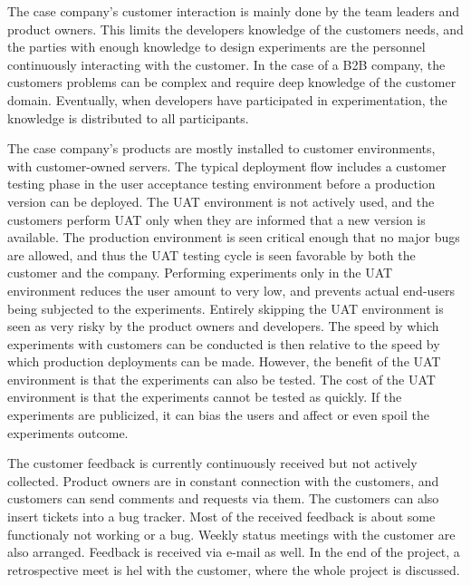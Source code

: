 \documentclass[english, grading]{tktltiki2}
\theoremstyle{definition}
\theoremstyle{remark}
\begin{document}
The case company's customer interaction is mainly done by the team leaders and product owners. This limits the developers knowledge of the customers needs, and the parties with enough knowledge to design experiments are the personnel continuously interacting with the customer. In the case of a B2B company, the customers problems can be complex and require deep knowledge of the customer domain. Eventually, when developers have participated in experimentation, the knowledge is distributed to all participants.

The case company's products are mostly installed to customer environments, with customer-owned servers. The typical deployment flow includes a customer testing phase in the user acceptance testing environment before a production version can be deployed. The UAT environment is not actively used, and the customers perform UAT only when they are informed that a new version is available. The production environment is seen critical enough that no major bugs are allowed, and thus the UAT testing cycle is seen favorable by both the customer and the company. Performing experiments only in the UAT environment reduces the user amount to very low, and prevents actual end-users being subjected to the experiments. Entirely skipping the UAT environment is seen as very risky by the product owners and developers. The speed by which experiments with customers can be conducted is then relative to the speed by which production deployments can be made. However, the benefit of the UAT environment is that the experiments can also be tested. The cost of the UAT environment is that the experiments cannot be tested as quickly. If the experiments are publicized, it can bias the users and affect or even spoil the experiments outcome.  


The customer feedback is currently continuously received but not actively collected. Product owners are in constant connection with the customers, and customers can send comments and requests via them. The customers can also insert tickets into a bug tracker. Most of the received feedback is about some functionaly not working or a bug. Weekly status meetings with the customer are also arranged. Feedback is received via e-mail as well. In the end of the project, a retrospective meet is hel with the customer, where the whole project is discussed.  
\end{document}

